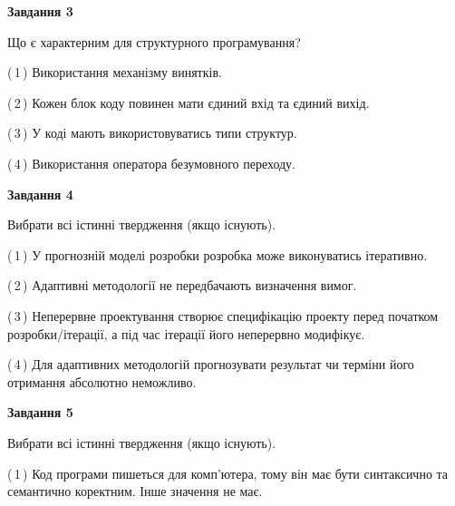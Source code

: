 \documentclass[10pt, ukrainian]{article}
\begin{document}
{\begin {large}
{\begin {center}\textbf{Завдання 3}\end {center}}\par
Що є характерним для структурного програмування?\par
\vspace{2mm}



(\,1\,) Використання механізму винятків. %



(\,2\,) Кожен блок коду повинен мати єдиний вхід та єдиний вихід.%



(\,3\,) У коді мають використовуватись типи структур. %



(\,4\,) Використання оператора безумовного переходу. %


{\begin {center}\textbf{Завдання 4}\end {center}}\par
Вибрати всі істинні твердження (якщо існують).\par
\vspace{2mm}



(\,1\,) У прогнозній моделі розробки розробка може виконуватись ітеративно. %



(\,2\,) Адаптивні методології не передбачають визначення вимог. %



(\,3\,) Неперервне проектування створює специфікацію проекту перед початком розробки/ітерації, а під час ітерації його неперервно модифікує.%



(\,4\,) Для адаптивних методологій прогнозувати результат чи терміни його отримання абсолютно неможливо. %


{\begin {center}\textbf{Завдання 5}\end {center}}\par
Вибрати всі істинні твердження (якщо існують).\par
\vspace{2mm}



(\,1\,) Код програми пишеться для комп'ютера, тому він має бути синтаксично та семантично коректним. Інше значення не має. %




\end{large}}
\end{document}
